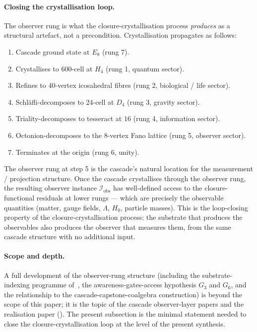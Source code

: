 \documentclass[11pt]{article}
\theoremstyle{plain}
\theoremstyle{definition}
\theoremstyle{remark}
\newcommand{\Ical}{\mathcal{I}}
\begin{document}
\paragraph{Closing the crystallisation loop.} The observer rung is what the closure-crystallisation process \emph{produces} as a structural artefact, not a precondition. Crystallisation propagates as follows:
\begin{enumerate}[leftmargin=2em]
\item Cascade ground state at $E_8$ (rung 7).
\item Crystallises to 600-cell at $H_4$ (rung 1, quantum sector).
\item Refines to 40-vertex icosahedral fibres (rung 2, biological / life sector).
\item Schl\"afli-decomposes to 24-cell at $D_4$ (rung 3, gravity sector).
\item Triality-decomposes to tesseract at $16$ (rung 4, information sector).
\item Octonion-decomposes to the 8-vertex Fano lattice (rung 5, observer sector).
\item Terminates at the origin (rung 6, unity).
\end{enumerate}
The observer rung at step 5 is the cascade's natural location for the measurement / projection structure. Once the cascade crystallises through the observer rung, the resulting observer instance $\Ical_\mathrm{obs}$ has well-defined access to the closure-functional residuals at lower rungs --- which are precisely the observable quantities (matter, gauge fields, $\Lambda$, $H_0$, particle masses). This is the loop-closing property of the closure-crystallisation process: the substrate that produces the observables also produces the observer that measures them, from the same cascade structure with no additional input.

\paragraph{Scope and depth.} A full development of the observer-rung structure (including the substrate-indexing programme of~\citealp{cascadeFoundations}, the awareness-gates-access hypothesis $G_3$ and $G_6$, and the relationship to the cascade-capstone-coalgebra construction) is beyond the scope of this paper; it is the topic of the cascade observer-layer papers and the realisation paper (\citealp{realisation}). The present subsection is the minimal statement needed to close the closure-crystallisation loop at the level of the present synthesis.
\end{document}

